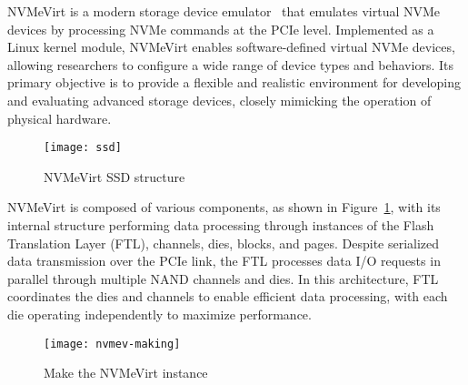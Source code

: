 
NVMeVirt is a modern storage device emulator~\cite{nvmevirt} that emulates virtual NVMe devices by processing NVMe commands at the PCIe level.
Implemented as a Linux kernel module, NVMeVirt enables software-defined virtual NVMe devices, allowing researchers to configure a wide range of device types and behaviors.
Its primary objective is to provide a flexible and realistic environment for developing and evaluating advanced storage devices, closely mimicking the operation of physical hardware.

\begin{figure}[t]
    \centering
    \texttt{[image: ssd]}
    \caption{NVMeVirt SSD structure}
    \label{fig:structure}
\end{figure}


NVMeVirt is composed of various components, as shown in Figure~\ref{fig:structure}, with its internal structure performing data processing through instances of the Flash Translation Layer (FTL), channels, dies, blocks, and pages.
Despite serialized data transmission over the PCIe link, the FTL processes data I/O requests in parallel through multiple NAND channels and dies.
In this architecture, FTL coordinates the dies and channels to enable efficient data processing, with each die operating independently to maximize performance.


\begin{figure}[t]
    \centering
    \texttt{[image: nvmev-making]}
    \caption{Make the NVMeVirt instance}
    \label{fig:making}
\end{figure}



